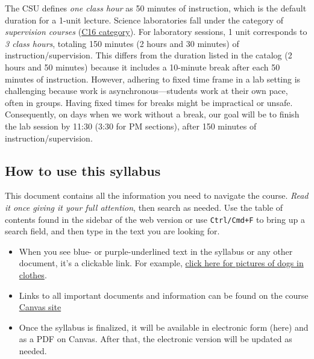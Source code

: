 The CSU defines \emph{one class hour} as 50 minutes of instruction,
which is the default duration for a 1-unit lecture. Science laboratories
fall under the category of \emph{supervision courses}
(\href{https://academics.fresnostate.edu/scheduling/documents/CourseClassificationSystem%201.3.18.pdf}{C16
category}). For laboratory sessions, 1 unit corresponds to \emph{3 class
hours}, totaling 150 minutes (2 hours and 30 minutes) of
instruction/supervision. This differs from the duration listed in the
catalog (2 hours and 50 minutes) because it includes a 10-minute break
after each 50 minutes of instruction. However, adhering to fixed time
frame in a lab setting is challenging because work is
asynchronous---students work at their own pace, often in groups. Having
fixed times for breaks might be impractical or unsafe. Consequently, on
days when we work without a break, our goal will be to finish the lab
session by 11:30 (3:30 for PM sections), after 150 minutes of
instruction/supervision.

\subsection{\texorpdfstring{How to use this syllabus
}{How to use this syllabus }}\label{how-to-use-this-syllabus}

This document contains all the information you need to navigate the
course. \emph{Read it once giving it your full attention}, then search
as needed. Use the table of contents found in the sidebar of the web
version or use \texttt{Ctrl/Cmd+F} to bring up a search field, and then
type in the text you are looking for.

\begin{itemize}
\tightlist
\item
  When you see blue- or purple-underlined text in the syllabus or any
  other document, it's a clickable link. For example,
  \href{https://start.duckduckgo.com/?q=dogs+wearing+clothes&iar=images&iax=images&ia=images&kp=1}{click
  here for pictures of dogs in clothes}.
\item
  Links to all important documents and information can be found on the
  course \href{https://fresnostate.instructure.com/courses/76128}{Canvas
  site}
\item
  Once the syllabus is finalized, it will be available in electronic
  form (here) and as a PDF on Canvas. After that, the electronic version
  will be updated as needed.
\end{itemize}

